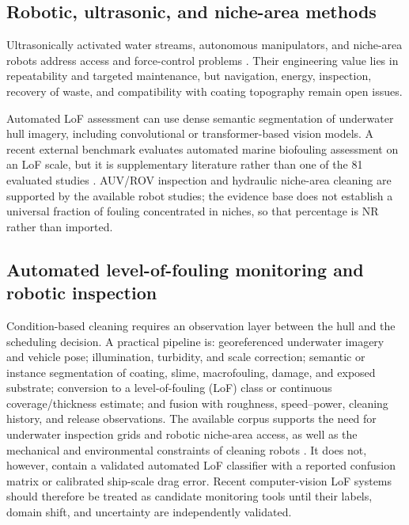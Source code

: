 \subsection{Robotic, ultrasonic, and niche-area methods}
Ultrasonically activated water streams, autonomous manipulators, and niche-area robots address access and force-control problems \cite{salta_bubbles_2016,park_development_2023}. Their engineering value lies in repeatability and targeted maintenance, but navigation, energy, inspection, recovery of waste, and compatibility with coating topography remain open issues.

Automated LoF assessment can use dense semantic segmentation of underwater hull imagery, including convolutional or transformer-based vision models. A recent external benchmark evaluates automated marine biofouling assessment on an LoF scale, but it is supplementary literature rather than one of the 81 evaluated studies \cite{arxiv2601lof}. AUV/ROV inspection and hydraulic niche-area cleaning are supported by the available robot studies; the evidence base does not establish a universal fraction of fouling concentrated in niches, so that percentage is NR rather than imported.

\subsection{Automated level-of-fouling monitoring and robotic inspection}
Condition-based cleaning requires an observation layer between the hull and the scheduling decision. A practical pipeline is: georeferenced underwater imagery and vehicle pose; illumination, turbidity, and scale correction; semantic or instance segmentation of coating, slime, macrofouling, damage, and exposed substrate; conversion to a level-of-fouling (LoF) class or continuous coverage/thickness estimate; and fusion with roughness, speed--power, cleaning history, and release observations. The available corpus supports the need for underwater inspection grids and robotic niche-area access, as well as the mechanical and environmental constraints of cleaning robots \cite{hearin_analysis_2016,madanipour_modal_2023,park_development_2023}. It does not, however, contain a validated automated LoF classifier with a reported confusion matrix or calibrated ship-scale drag error. Recent computer-vision LoF systems should therefore be treated as candidate monitoring tools until their labels, domain shift, and uncertainty are independently validated.

